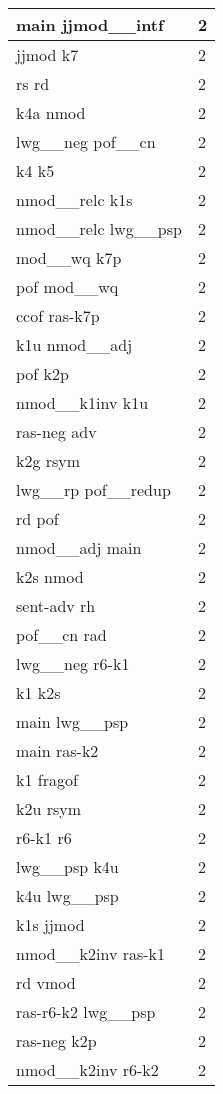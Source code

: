 \documentclass[a4 paper]{article}
\begin{document}
\begin{longtable}{p{}p{}}
main jjmod\_\_intf  & 2 \\ \midrule
jjmod k7  & 2 \\ \midrule
rs rd  & 2 \\ \midrule
k4a nmod  & 2 \\ \midrule
lwg\_\_neg pof\_\_cn  & 2 \\ \midrule
k4 k5  & 2 \\ \midrule
nmod\_\_relc k1s  & 2 \\ \midrule
nmod\_\_relc lwg\_\_psp  & 2 \\ \midrule
mod\_\_wq k7p  & 2 \\ \midrule
pof mod\_\_wq  & 2 \\ \midrule
ccof ras-k7p  & 2 \\ \midrule
k1u nmod\_\_adj  & 2 \\ \midrule
pof k2p  & 2 \\ \midrule
nmod\_\_k1inv k1u  & 2 \\ \midrule
ras-neg adv  & 2 \\ \midrule
k2g rsym  & 2 \\ \midrule
lwg\_\_rp pof\_\_redup  & 2 \\ \midrule
rd pof  & 2 \\ \midrule
nmod\_\_adj main  & 2 \\ \midrule
k2s nmod  & 2 \\ \midrule
sent-adv rh  & 2 \\ \midrule
pof\_\_cn rad  & 2 \\ \midrule
lwg\_\_neg r6-k1  & 2 \\ \midrule
k1 k2s  & 2 \\ \midrule
main lwg\_\_psp  & 2 \\ \midrule
main ras-k2  & 2 \\ \midrule
k1 fragof  & 2 \\ \midrule
k2u rsym  & 2 \\ \midrule
r6-k1 r6  & 2 \\ \midrule
lwg\_\_psp k4u  & 2 \\ \midrule
k4u lwg\_\_psp  & 2 \\ \midrule
k1s jjmod  & 2 \\ \midrule
nmod\_\_k2inv ras-k1  & 2 \\ \midrule
rd vmod  & 2 \\ \midrule
ras-r6-k2 lwg\_\_psp  & 2 \\ \midrule
ras-neg k2p  & 2 \\ \midrule
nmod\_\_k2inv r6-k2  & 2 \\ \midrule

\end{longtable}
\end{document}

